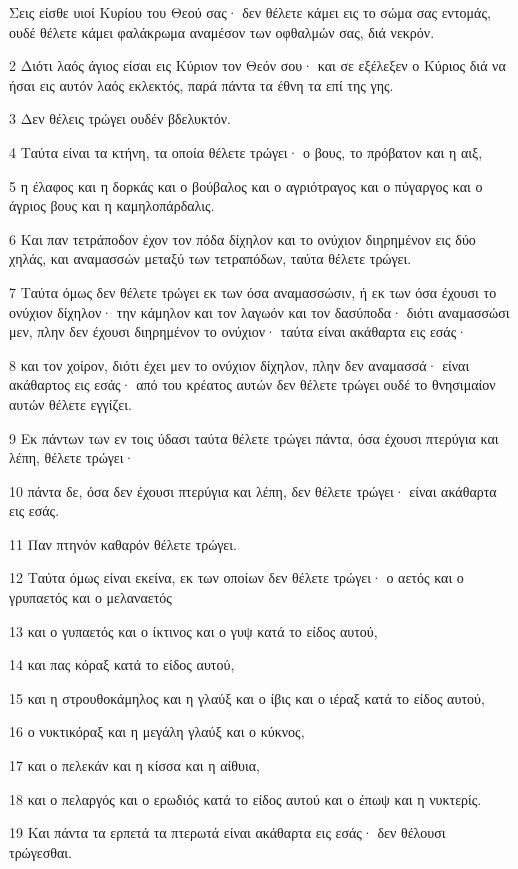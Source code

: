 \par Σεις είσθε υιοί Κυρίου του Θεού σας· δεν θέλετε κάμει εις το σώμα σας εντομάς, ουδέ θέλετε κάμει φαλάκρωμα αναμέσον των οφθαλμών σας, διά νεκρόν.
\par 2 Διότι λαός άγιος είσαι εις Κύριον τον Θεόν σου· και σε εξέλεξεν ο Κύριος διά να ήσαι εις αυτόν λαός εκλεκτός, παρά πάντα τα έθνη τα επί της γης.
\par 3 Δεν θέλεις τρώγει ουδέν βδελυκτόν.
\par 4 Ταύτα είναι τα κτήνη, τα οποία θέλετε τρώγει· ο βους, το πρόβατον και η αιξ,
\par 5 η έλαφος και η δορκάς και ο βούβαλος και ο αγριότραγος και ο πύγαργος και ο άγριος βους και η καμηλοπάρδαλις.
\par 6 Και παν τετράποδον έχον τον πόδα δίχηλον και το ονύχιον διηρημένον εις δύο χηλάς, και αναμασσών μεταξύ των τετραπόδων, ταύτα θέλετε τρώγει.
\par 7 Ταύτα όμως δεν θέλετε τρώγει εκ των όσα αναμασσώσιν, ή εκ των όσα έχουσι το ονύχιον δίχηλον· την κάμηλον και τον λαγωόν και τον δασύποδα· διότι αναμασσώσι μεν, πλην δεν έχουσι διηρημένον το ονύχιον· ταύτα είναι ακάθαρτα εις εσάς·
\par 8 και τον χοίρον, διότι έχει μεν το ονύχιον δίχηλον, πλην δεν αναμασσά· είναι ακάθαρτος εις εσάς· από του κρέατος αυτών δεν θέλετε τρώγει ουδέ το θνησιμαίον αυτών θέλετε εγγίζει.
\par 9 Εκ πάντων των εν τοις ύδασι ταύτα θέλετε τρώγει πάντα, όσα έχουσι πτερύγια και λέπη, θέλετε τρώγει·
\par 10 πάντα δε, όσα δεν έχουσι πτερύγια και λέπη, δεν θέλετε τρώγει· είναι ακάθαρτα εις εσάς.
\par 11 Παν πτηνόν καθαρόν θέλετε τρώγει.
\par 12 Ταύτα όμως είναι εκείνα, εκ των οποίων δεν θέλετε τρώγει· ο αετός και ο γρυπαετός και ο μελαναετός
\par 13 και ο γυπαετός και ο ίκτινος και ο γυψ κατά το είδος αυτού,
\par 14 και πας κόραξ κατά το είδος αυτού,
\par 15 και η στρουθοκάμηλος και η γλαύξ και ο ίβις και ο ιέραξ κατά το είδος αυτού,
\par 16 ο νυκτικόραξ και η μεγάλη γλαύξ και ο κύκνος,
\par 17 και ο πελεκάν και η κίσσα και η αίθυια,
\par 18 και ο πελαργός και ο ερωδιός κατά το είδος αυτού και ο έπωψ και η νυκτερίς.
\par 19 Και πάντα τα ερπετά τα πτερωτά είναι ακάθαρτα εις εσάς· δεν θέλουσι τρώγεσθαι.
